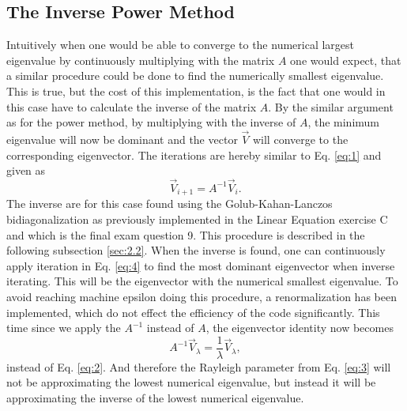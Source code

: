 \documentclass[twocolumn]{article}
\begin{document}
\subsection{\label{sec:2}The Inverse Power Method}
Intuitively when one would be able to converge to the numerical largest eigenvalue by continuously multiplying with the matrix $A$ one would expect, that a similar procedure could be done to find the numerically smallest eigenvalue. This is true, but the cost of this implementation, is the fact that one would in this case have to calculate the inverse of the matrix $A$. By the similar argument as for the power method, by multiplying with the inverse of $A$, the minimum eigenvalue will now be dominant and the vector $\vec{V}$ will converge to the corresponding eigenvector. The iterations are hereby similar to Eq. \eqref{eq:1} and given as
\begin{equation}
\vec{V}_{i+1} = A^{-1} \vec{V}_i. \label{eq:4}
\end{equation}
The inverse are for this case found using the Golub-Kahan-Lanczos bidiagonalization as previously implemented in the Linear Equation exercise C and which is the final exam question 9. This procedure is described in the following subsection \ref{sec:2.2}. When the inverse is found, one can continuously apply iteration in Eq. \eqref{eq:4} to find the most dominant eigenvector when inverse iterating. This will be the eigenvector with the numerical smallest eigenvalue. To avoid reaching machine epsilon doing this procedure, a renormalization has been implemented, which do not effect the efficiency of the code significantly. 
This time since we apply the $A^{-1}$ instead of $A$, the eigenvector identity now becomes
\begin{equation}
 A^{-1} \vec{V}_\lambda = \frac{1}{\lambda} \vec{V}_\lambda, \label{eq:5}
\end{equation}
instead of Eq. \eqref{eq:2}. And therefore the Rayleigh parameter from Eq. \eqref{eq:3} will not be approximating the lowest numerical eigenvalue, but instead it will  be approximating the inverse of the lowest numerical eigenvalue.
 
\end{document}
